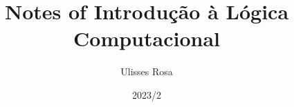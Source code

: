 \documentclass[working]{article}
\title{Notes of Introdução à Lógica Computacional}
\author{Ulisses Rosa}
\date{2023/2}
\begin{document}
  
  
  

  \listnotes
\end{document}
